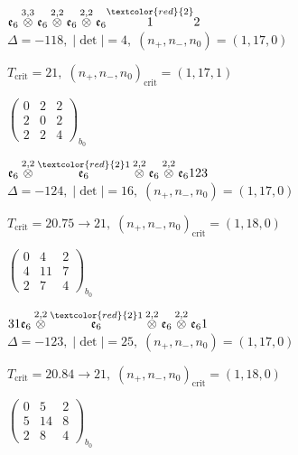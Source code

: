 \documentclass[10pt]{article}
\begin{document}
$\mathfrak{e}_6\overset{3,3}{\otimes}\mathfrak{e}_6\overset{2,2}{\otimes}\mathfrak{e}_6\overset{2,2}{\otimes}\mathfrak{e}_6\overset{\textcolor{red}{2}}{1}2$ \quad $\Delta=-118,\; |\det|=4,\; (n_+,n_-,n_0)=(1,17,0)$

\hspace{1em}$T_{\text{crit}}=21,\; (n_+,n_-,n_0)_{\text{crit}}=(1,17,1)$

\hspace{2em}$\left(\begin{smallmatrix}0 & 2 & 2 \\ 2 & 0 & 2 \\ 2 & 2 & 4\end{smallmatrix}\right)_{\!b_0}$

\smallskip

$\mathfrak{e}_6\overset{2,2}{\otimes}\overset{\textcolor{red}{2}1}{\mathfrak{e}_6}\overset{2,2}{\otimes}\mathfrak{e}_6\overset{2,2}{\otimes}\mathfrak{e}_6123$ \quad $\Delta=-124,\; |\det|=16,\; (n_+,n_-,n_0)=(1,17,0)$

\hspace{1em}$T_{\text{crit}}=20.75 \to 21,\; (n_+,n_-,n_0)_{\text{crit}}=(1,18,0)$

\hspace{2em}$\left(\begin{smallmatrix}0 & 4 & 2 \\ 4 & 11 & 7 \\ 2 & 7 & 4\end{smallmatrix}\right)_{\!b_0}$

\smallskip

$31\mathfrak{e}_6\overset{2,2}{\otimes}\overset{\textcolor{red}{2}1}{\mathfrak{e}_6}\overset{2,2}{\otimes}\mathfrak{e}_6\overset{2,2}{\otimes}\mathfrak{e}_61$ \quad $\Delta=-123,\; |\det|=25,\; (n_+,n_-,n_0)=(1,17,0)$

\hspace{1em}$T_{\text{crit}}=20.84 \to 21,\; (n_+,n_-,n_0)_{\text{crit}}=(1,18,0)$

\hspace{2em}$\left(\begin{smallmatrix}0 & 5 & 2 \\ 5 & 14 & 8 \\ 2 & 8 & 4\end{smallmatrix}\right)_{\!b_0}$
\end{document}
